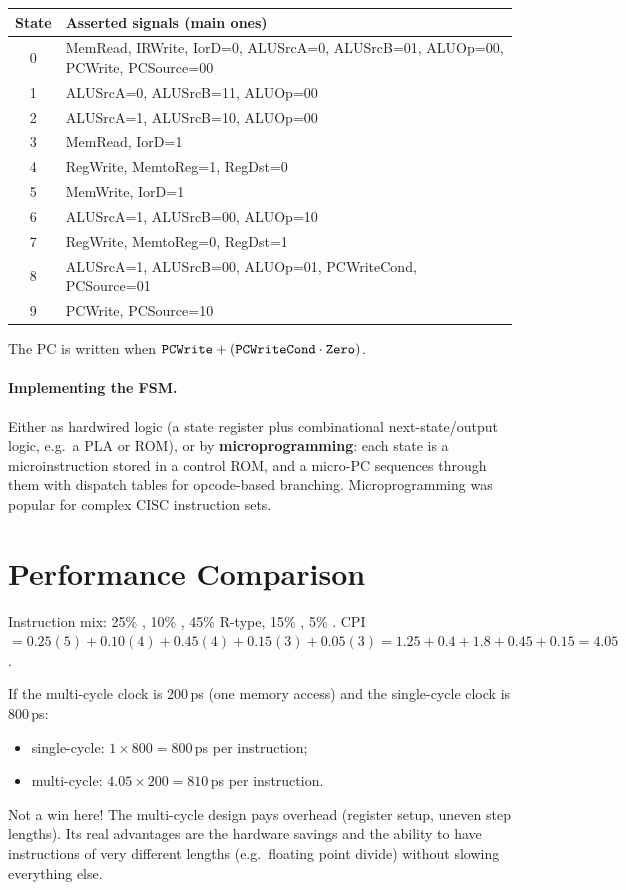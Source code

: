 \begin{center}
\begin{tabular}{cp{13cm}}
\toprule
State & Asserted signals (main ones) \\
\midrule
0 & MemRead, IRWrite, IorD=0, ALUSrcA=0, ALUSrcB=01, ALUOp=00, PCWrite, PCSource=00 \\
1 & ALUSrcA=0, ALUSrcB=11, ALUOp=00 \\
2 & ALUSrcA=1, ALUSrcB=10, ALUOp=00 \\
3 & MemRead, IorD=1 \\
4 & RegWrite, MemtoReg=1, RegDst=0 \\
5 & MemWrite, IorD=1 \\
6 & ALUSrcA=1, ALUSrcB=00, ALUOp=10 \\
7 & RegWrite, MemtoReg=0, RegDst=1 \\
8 & ALUSrcA=1, ALUSrcB=00, ALUOp=01, PCWriteCond, PCSource=01 \\
9 & PCWrite, PCSource=10 \\
\bottomrule
\end{tabular}
\end{center}

The PC is written when $\texttt{PCWrite} + (\texttt{PCWriteCond} \cdot
\texttt{Zero})$.

\paragraph{Implementing the FSM.} Either as hardwired logic (a state
register plus combinational next-state/output logic, e.g.\ a PLA or ROM),
or by \textbf{microprogramming}: each state is a microinstruction stored in
a control ROM, and a micro-PC sequences through them with dispatch tables
for opcode-based branching. Microprogramming was popular for complex CISC
instruction sets.

\section{Performance Comparison}

\begin{example}
Instruction mix: 25\% , 10\% , 45\% R-type, 15\% ,
5\% . CPI $= 0.25(5) + 0.10(4) + 0.45(4) + 0.15(3) + 0.05(3)
= 1.25 + 0.4 + 1.8 + 0.45 + 0.15 = 4.05$.

If the multi-cycle clock is 200\,ps (one memory access) and the
single-cycle clock is 800\,ps:
\begin{itemize}
  \item single-cycle: $1 \times 800 = 800$\,ps per instruction;
  \item multi-cycle: $4.05 \times 200 = 810$\,ps per instruction.
\end{itemize}
Not a win here! The multi-cycle design pays overhead (register setup,
uneven step lengths). Its real advantages are the hardware savings and the
ability to have instructions of very different lengths (e.g.\ floating
point divide) without slowing everything else.
\end{example}

